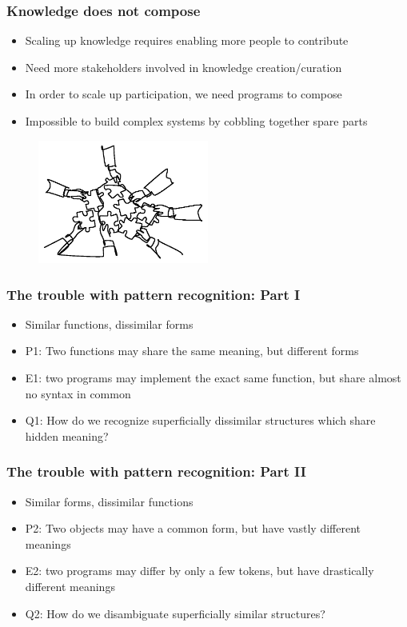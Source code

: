 \documentclass{beamer}
\begin{document}
  \begin{frame}
    \frametitle{Knowledge does not compose}
    \begin{itemize}
      \item Scaling up knowledge requires enabling more people to contribute
      \item Need more stakeholders involved in knowledge creation/curation
      \item In order to scale up participation, we need programs to compose
      \item Impossible to build complex systems by cobbling together spare parts
    \end{itemize}
    \begin{figure}[H]
      \centering
      \includegraphics[width=0.5\textwidth]{../clipart/compositionality.jpeg}
    \end{figure}
  \end{frame}

  \begin{frame}
    \frametitle{The trouble with pattern recognition: Part I}
    \begin{itemize}
      \item Similar functions, dissimilar forms
      \item P1: Two functions may share the same meaning, but different forms
      \item E1: two programs may implement the exact same function, but share almost no syntax in common
      \item Q1: How do we recognize superficially dissimilar structures which share hidden meaning?
    \end{itemize}
  \end{frame}

  \begin{frame}
    \frametitle{The trouble with pattern recognition: Part II}
    \begin{itemize}
      \item Similar forms, dissimilar functions
      \item P2: Two objects may have a common form, but have vastly different meanings
      \item E2: two programs may differ by only a few tokens, but have drastically different meanings
      \item Q2: How do we disambiguate superficially similar structures?
    \end{itemize}
  \end{frame}
\end{document}
